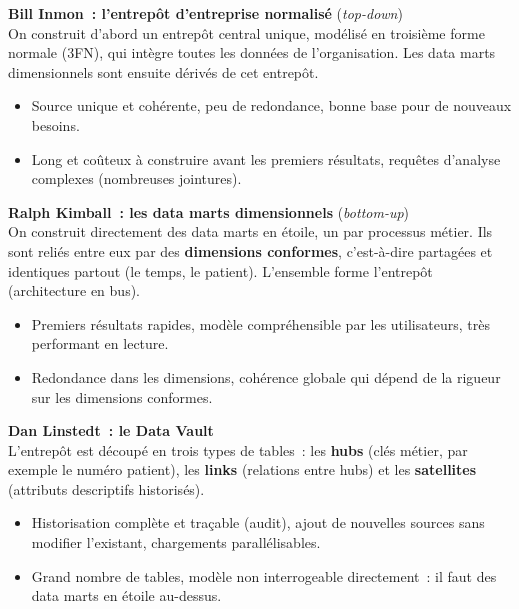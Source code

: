 \noindent \textbf{Bill Inmon~: l'entrepôt d'entreprise normalisé} (\textit{top-down})\\
On construit d'abord un entrepôt central unique, modélisé en troisième forme normale (3FN), qui intègre toutes les données de l'organisation. Les data marts dimensionnels sont ensuite dérivés de cet entrepôt.
\begin{itemize}
	\item[+] Source unique et cohérente, peu de redondance, bonne base pour de nouveaux besoins.
	\item[--] Long et coûteux à construire avant les premiers résultats, requêtes d'analyse complexes (nombreuses jointures).
\end{itemize}

\noindent \textbf{Ralph Kimball~: les data marts dimensionnels} (\textit{bottom-up})\\
On construit directement des data marts en étoile, un par processus métier. Ils sont reliés entre eux par des \textbf{dimensions conformes}, c'est-à-dire partagées et identiques partout (le temps, le patient). L'ensemble forme l'entrepôt (architecture en bus).
\begin{itemize}
	\item[+] Premiers résultats rapides, modèle compréhensible par les utilisateurs, très performant en lecture.
	\item[--] Redondance dans les dimensions, cohérence globale qui dépend de la rigueur sur les dimensions conformes.
\end{itemize}

\noindent \textbf{Dan Linstedt~: le Data Vault}\\
L'entrepôt est découpé en trois types de tables~: les \textbf{hubs} (clés métier, par exemple le numéro patient), les \textbf{links} (relations entre hubs) et les \textbf{satellites} (attributs descriptifs historisés).
\begin{itemize}
	\item[+] Historisation complète et traçable (audit), ajout de nouvelles sources sans modifier l'existant, chargements parallélisables.
	\item[--] Grand nombre de tables, modèle non interrogeable directement~: il faut des data marts en étoile au-dessus.
\end{itemize}

